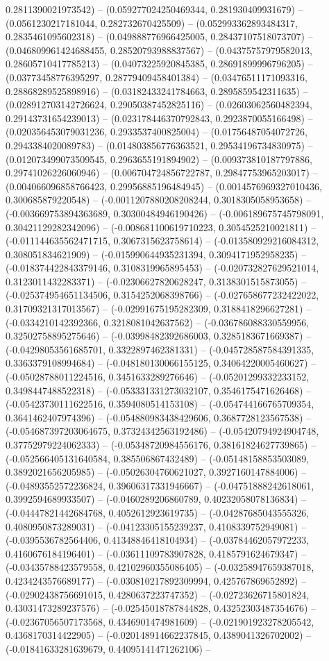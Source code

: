 0.2811390021973542) -- (0.059277024250469344, 0.281930409931679) -- (0.0561230217181044, 0.282732670425509) -- (0.052993362893484317, 0.2835461095602318) -- (0.049888776966425005, 0.28437107518073707) -- (0.046809961424688455, 0.28520793988837567) -- (0.04375757979582013, 0.28605710417785213) -- (0.04073225920845385, 0.28691899996796205) -- (0.03773458776395297, 0.28779409458401384) -- (0.03476511171093316, 0.28868289525898916) -- (0.03182433241784663, 0.2895859542311635) -- (0.028912703142726624, 0.29050387452825116) -- (0.02603062560482394, 0.29143731654239013) -- (0.023178446370792843, 0.2923870055166498) -- (0.020356453079031236, 0.2933537400825004) -- (0.01756487054072726, 0.2943384020089783) -- (0.014803856776363521, 0.29534196734830975) -- (0.012073499073509545, 0.2963655191894902) -- (0.009373810187797886, 0.29741026226060946) -- (0.006704724856722787, 0.29847753965203017) -- (0.004066096858766423, 0.29956885196484945) -- (0.0014576969327010436, 0.300685879220548) -- (-0.0011207880208208244, 0.3018305058953658) -- (-0.003669753894363689, 0.30300484946190426) -- (-0.006189675745798091, 0.30421129282342096) -- (-0.008681100619710223, 0.3054525210021811) -- (-0.011144635562471715, 0.3067315623758614) -- (-0.013580929216084312, 0.308051834621909) -- (-0.015990644935231394, 0.3094171952958235) -- (-0.018374422843379146, 0.3108319965895453) -- (-0.020732827629521014, 0.3123011432283371) -- (-0.02306627820628247, 0.3138301515873055) -- (-0.025374954651134506, 0.3154252068398766) -- (-0.027658677232422022, 0.31709321317013567) -- (-0.02991675195282309, 0.3188418296627281) -- (-0.0334210142392366, 0.3218081042637562) -- (-0.036786088330559956, 0.32502758895275646) -- (-0.03998482392686003, 0.3285183671669387) -- (-0.04298053561685701, 0.3322897462381331) -- (-0.045728587584391335, 0.3363379108994684) -- (-0.048180130066155125, 0.34064220005460627) -- (-0.05028788011224516, 0.3451633289276646) -- (-0.05201299332233152, 0.3498447488522318) -- (-0.053331331273032107, 0.3546175471626468) -- (-0.05423730111622516, 0.3594080514153108) -- (-0.054744166765709354, 0.3641462407974396) -- (-0.054880983438429606, 0.3687728123567538) -- (-0.054687397203064675, 0.37324342563192486) -- (-0.05420794924904748, 0.37752979224062333) -- (-0.05348720984556176, 0.38161824627739865) -- (-0.052566405131640584, 0.385506867432489) -- (-0.05148158853503089, 0.3892021656205985) -- (-0.05026304760621027, 0.3927160147884006) -- (-0.04893552572236824, 0.39606317331946667) -- (-0.04751888242618061, 0.3992594689933507) -- (-0.0460289206860789, 0.40232058078136834) -- (-0.04447821442684768, 0.4052612923619735) -- (-0.04287685043555326, 0.4080950873289031) -- (-0.04123305155239237, 0.4108339752949081) -- (-0.0395536782564406, 0.41348846418104934) -- (-0.03784462057972233, 0.4160676184196401) -- (-0.03611109783907828, 0.4185791624679347) -- (-0.03435788423579558, 0.42102960355086405) -- (-0.03258947659387018, 0.4234243576689177) -- (-0.030810217892309994, 0.425767869652892) -- (-0.02902438756691015, 0.4280637223747352) -- (-0.02723626715801824, 0.43031473289237576) -- (-0.02545018787844828, 0.43252303487354676) -- (-0.02367056507173568, 0.4346901474981609) -- (-0.021901923278205542, 0.4368170314422905) -- (-0.020148914662237845, 0.4389041326702002) -- (-0.01841633281639679, 0.44095141471262106) -- 